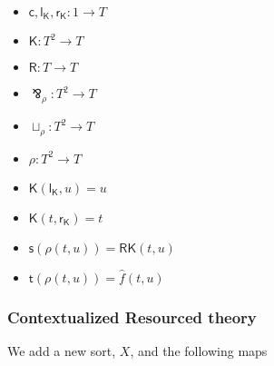 \documentclass{llncs}
\renewcommand{\:}{\colon}
\begin{document}

\begin{itemize}
  \item $\mathsf{c}, \mathsf{l}_{\mathsf{K}}, \mathsf{r}_{\mathsf{K}} : 1 \rightarrow T$
  \item $\mathsf{K} : T^{2} \rightarrow T$
  \item $\mathsf{R} : T \rightarrow T$
  \item $\bindnasrepma_{\rho} : T^{2} \rightarrow T$
  \item $\sqcup_{\rho} : T^{2} \rightarrow T$
  \item $\rho : T^{2} \rightarrow T$             %
  \item $\mathsf{K}(\mathsf{l}_{\mathsf{K}}, u) = u$
  \item $\mathsf{K}(t, \mathsf{r}_{\mathsf{K}}) = t$
  \item $\mathsf{s}(\rho(t,u)) = \mathsf{R}\mathsf{K}(t, u)$
  \item $\mathsf{t}(\rho(t,u)) = \hat{f}(t,u)$                    %
\end{itemize}

\subsubsection{Contextualized Resourced theory}
We add a new sort, $X$, and the following maps

\end{document}
